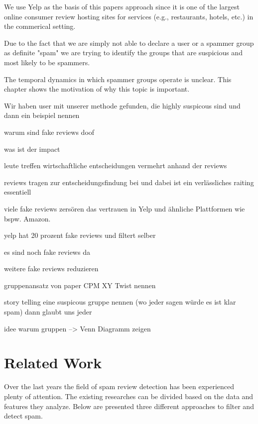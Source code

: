 \documentclass[conference]{IEEEtran}  %
\theoremstyle{plain}
\theoremstyle{definition}
\theoremstyle{remark}
\begin{document}
We use Yelp as the basis of this papers approach since it is one of the largest online consumer review hosting sites for services (e.g., restaurants, hotels, etc.) in the commerical setting. 

Due to the fact that we are simply not able to declare a user or a spammer group as definite "spam" we are trying to identify the groups that are suspicious and most likely to be spammers. 



The temporal dynamics in which spammer groups operate is unclear.\cite{kc2016dynamics}
This chapter shows the motivation of why this topic is important. 

Wir haben user mit unserer methode gefunden, die highly suspicous sind und dann ein beispiel nennen

warum sind fake reviews doof

was ist der impact

leute treffen wirtschaftliche entscheidungen vermehrt anhand der reviews

reviews tragen zur entscheidungsfindung bei und dabei ist ein verlässliches raiting essentiell

viele fake reviews zersören das vertrauen in Yelp und ähnliche Plattformen wie bspw. Amazon.


yelp hat 20 prozent fake reviews
und filtert selber

es sind noch fake reviews da

weitere fake reviews reduzieren

gruppenansatz von paper CPM XY
Twist nennen

story telling eine suspicous gruppe nennen
(wo jeder sagen würde es ist klar spam)
dann glaubt uns jeder

idee warum gruppen --> Venn Diagramm zeigen 

\section{Related Work}
\label{sec:related_work}

Over the last years the field of spam review detection has been experienced plenty of attention. The existing researches can be divided based on the data and features they analyze. Below are presented three different approaches to filter and detect spam. \cite {xu2019cpm} 
\end{document}
